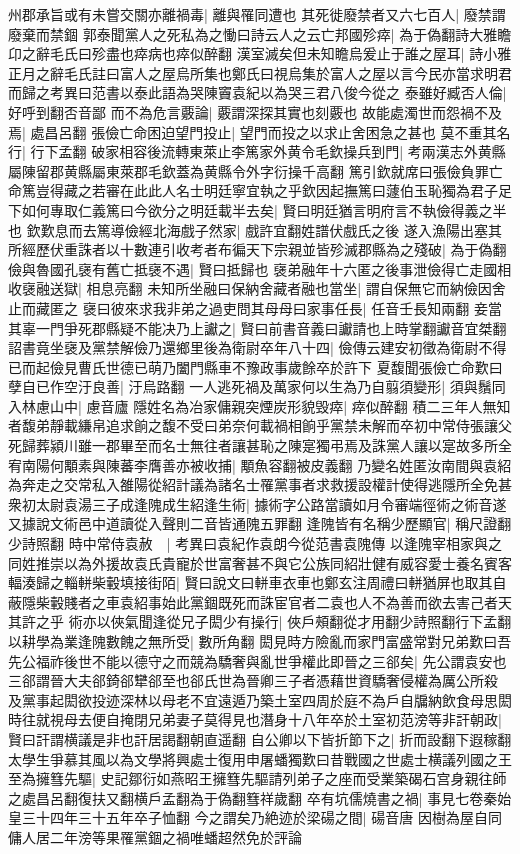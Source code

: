 州郡承旨或有未嘗交關亦離禍毒|{
	離與罹同遭也}
其死徙廢禁者又六七百人|{
	廢禁謂廢棄而禁錮}
郭泰聞黨人之死私為之慟曰詩云人之云亡邦國殄瘁|{
	為于偽翻詩大雅瞻卬之辭毛氏曰殄盡也瘁病也瘁似醉翻}
漢室滅矣但未知瞻烏爰止于誰之屋耳|{
	詩小雅正月之辭毛氏註曰富人之屋烏所集也鄭氏曰視烏集於富人之屋以言今民亦當求明君而歸之考異曰范書以泰此語為哭陳竇袁紀以為哭三君八俊今從之}
泰雖好臧否人倫|{
	好呼到翻否音鄙}
而不為危言覈論|{
	覈謂深探其實也刻覈也}
故能處濁世而怨禍不及焉|{
	處昌呂翻}
張儉亡命困迫望門投止|{
	望門而投之以求止舍困急之甚也}
莫不重其名行|{
	行下孟翻}
破家相容後流轉東萊止李篤家外黄令毛欽操兵到門|{
	考兩漢志外黄縣屬陳留郡黄縣屬東萊郡毛欽蓋為黄縣令外字衍操千高翻}
篤引欽就席曰張儉負罪亡命篤豈得藏之若審在此此人名士明廷寧宜執之乎欽因起撫篤曰蘧伯玉恥獨為君子足下如何專取仁義篤曰今欲分之明廷載半去矣|{
	賢曰明廷猶言明府言不執儉得義之半也}
欽歎息而去篤導儉經北海戲子然家|{
	戲許宜翻姓譜伏戲氏之後}
遂入漁陽出塞其所經歷伏重誅者以十數連引收考者布徧天下宗親並皆殄滅郡縣為之殘破|{
	為于偽翻}
儉與魯國孔襃有舊亡抵襃不遇|{
	賢曰抵歸也}
襃弟融年十六匿之後事泄儉得亡走國相收襃融送獄|{
	相息亮翻}
未知所坐融曰保納舍藏者融也當坐|{
	謂自保無它而納儉因舍止而藏匿之}
襃曰彼來求我非弟之過吏問其母母曰家事任長|{
	任音壬長知兩翻}
妾當其辜一門爭死郡縣疑不能决乃上讞之|{
	賢曰前書音義曰讞請也上時掌翻讞音宜桀翻}
詔書竟坐襃及黨禁解儉乃還鄉里後為衛尉卒年八十四|{
	儉傳云建安初徵為衛尉不得已而起儉見曹氏世德已萌乃闔門縣車不豫政事歲餘卒於許下}
夏馥聞張儉亡命歎曰孽自已作空汙良善|{
	汙烏路翻}
一人逃死禍及萬家何以生為乃自翦須變形|{
	須與鬚同}
入林慮山中|{
	慮音廬}
隱姓名為冶家傭親突煙炭形貌毁瘁|{
	瘁似醉翻}
積二三年人無知者馥弟靜載縑帛追求餉之馥不受曰弟奈何載禍相餉乎黨禁未解而卒初中常侍張讓父死歸葬潁川雖一郡畢至而名士無往者讓甚恥之陳寔獨弔焉及誅黨人讓以寔故多所全宥南陽何顒素與陳蕃李膺善亦被收捕|{
	顒魚容翻被皮義翻}
乃變名姓匿汝南間與袁紹為奔走之交常私入雒陽從紹計議為諸名士罹黨事者求救援設權計使得逃隱所全免甚衆初太尉袁湯三子成逢隗成生紹逢生術|{
	據術字公路當讀如月令審端徑術之術音遂又據說文術邑中道讀從入聲則二音皆通隗五罪翻}
逢隗皆有名稱少歷顯官|{
	稱尺證翻少詩照翻}
時中常侍袁赦　|{
	考異曰袁紀作袁朗今從范書袁隗傳}
以逢隗宰相家與之同姓推崇以為外援故袁氏貴寵於世富奢甚不與它公族同紹壯健有威容愛士養名賓客輻湊歸之輜軿柴轂填接街陌|{
	賢曰說文曰軿車衣車也鄭玄注周禮曰軿猶屏也取其自蔽隱柴轂賤者之車袁紹事始此黨錮既死而誅宦官者二袁也人不為善而欲去害己者天其許之乎}
術亦以俠氣聞逢從兄子閎少有操行|{
	俠戶頰翻從才用翻少詩照翻行下孟翻}
以耕學為業逢隗數餽之無所受|{
	數所角翻}
閎見時方險亂而家門富盛常對兄弟歎曰吾先公福祚後世不能以德守之而競為驕奢與亂世爭權此即晉之三郤矣|{
	先公謂袁安也三郤謂晉大夫郤錡郤犫郤至也郤氏世為晉卿三子者憑藉世資驕奢侵權為厲公所殺}
及黨事起閎欲投迹深林以母老不宜遠遁乃築土室四周於庭不為戶自牖納飲食母思閎時往就視母去便自掩閉兄弟妻子莫得見也潛身十八年卒於土室初范滂等非訐朝政|{
	賢曰訐謂横議是非也訐居謁翻朝直遥翻}
自公卿以下皆折節下之|{
	折而設翻下遐稼翻}
太學生爭慕其風以為文學將興處士復用申屠蟠獨歎曰昔戰國之世處士横議列國之王至為擁篲先驅|{
	史記鄒衍如燕昭王擁篲先驅請列弟子之座而受業築碣石宫身親往師之處昌呂翻復扶又翻横戶孟翻為于偽翻篲祥歲翻}
卒有坑儒燒書之禍|{
	事見七卷秦始皇三十四年三十五年卒子恤翻}
今之謂矣乃絶迹於梁碭之間|{
	碭音唐}
因樹為屋自同傭人居二年滂等果罹黨錮之禍唯蟠超然免於評論

